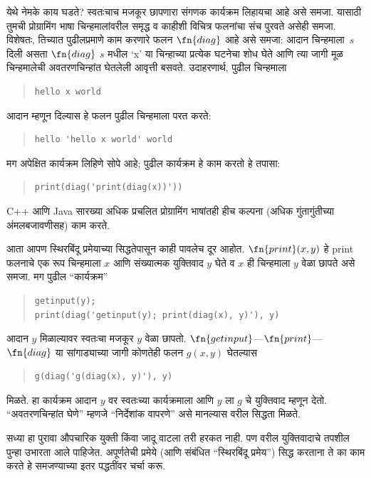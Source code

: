 \begin{explain}
येथे नेमके काय घडते? स्वतःचाच मजकूर छापणारा संगणक
कार्यक्रम लिहायचा आहे असे समजा. यासाठी तुमची प्रोग्रामिंग
भाषा चिन्हमालांवरील समृद्ध व काहीशी विचित्र फलनांचा संच
पुरवते असेही समजा. विशेषतः, तिच्यात पुढीलप्रमाणे काम करणारे
फलन $\fn{diag}$ आहे असे समजा: आदान चिन्हमाला~$s$
दिली असता $\fn{diag}$ $s$ मधील `x' या चिन्हाच्या प्रत्येक
घटनेचा शोध घेते आणि त्या जागी मूळ चिन्हमालेची अवतरणचिन्हांत
घेतलेली आवृत्ती बसवते. उदाहरणार्थ, पुढील चिन्हमाला
\begin{quote}
\begin{verbatim}
hello x world
\end{verbatim}
\end{quote}
आदान म्हणून दिल्यास हे फलन पुढील चिन्हमाला परत करते:
\begin{quote}
\begin{verbatim}
hello 'hello x world' world
\end{verbatim}
\end{quote}
मग अपेक्षित कार्यक्रम लिहिणे सोपे आहे; पुढील कार्यक्रम
हे काम करतो हे तपासा:
\begin{quote}
\begin{verbatim}
print(diag('print(diag(x))'))
\end{verbatim}
\end{quote}
C++ आणि Java सारख्या अधिक प्रचलित प्रोग्रामिंग भाषांतही
हीच कल्पना (अधिक गुंतागुंतीच्या अंमलबजावणीसह) काम करते.

आता आपण स्थिरबिंदू प्रमेयाच्या सिद्धतेपासून काही पावलेच
दूर आहोत. $\fn{print}(x,y)$ हे print फलनाचे एक रूप
चिन्हमाला $x$ आणि संख्यात्मक युक्तिवाद $y$ घेते व
$x$ ही चिन्हमाला $y$ वेळा छापते असे समजा. मग पुढील ``कार्यक्रम''
\begin{quote}
\begin{verbatim}
getinput(y);
print(diag('getinput(y); print(diag(x), y)'), y)
\end{verbatim}
\end{quote}
आदान $y$ मिळाल्यावर स्वतःचा मजकूर $y$ वेळा छापतो.
$\fn{getinput}$---$\fn{print}$---$\fn{diag}$ या सांगाड्याच्या
जागी कोणतेही फलन $g(x,y)$ घेतल्यास
\begin{quote}
\begin{verbatim}
g(diag('g(diag(x), y)'), y)
\end{verbatim}
\end{quote}
मिळते. हा कार्यक्रम आदान $y$ वर स्वतःच्या कार्यक्रमाला
आणि $y$ ला $g$ चे युक्तिवाद म्हणून देतो. ``अवतरणचिन्हांत
घेणे'' म्हणजे ``निर्देशांक वापरणे'' असे मानल्यास वरील
सिद्धता मिळते.

सध्या हा पुरावा औपचारिक युक्ती किंवा जादू वाटला तरी
हरकत नाही. पण वरील युक्तिवादाचे तपशील पुन्हा उभारता
आले पाहिजेत. अपूर्णतेची प्रमेये (आणि संबंधित ``स्थिरबिंदू
प्रमेय'') सिद्ध करताना ते का काम करते हे समजण्याच्या
इतर पद्धतींवर चर्चा करू.
\end{explain}













